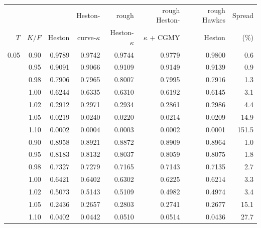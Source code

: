 \begin{tabular}{rrrrrrrr}
\toprule
 &  &  & Heston- & rough & rough Heston- & rough Hawkes & Spread\\
$T$ & $K/F$ & Heston & curve-$\kappa$ & Heston-$\kappa$ & $\kappa$ + CGMY & Heston & (\%)\\
\midrule
0.05 & 0.90 & 0.9789 & 0.9742 & 0.9744 & 0.9779 & 0.9800 & 0.6\\
 & 0.95 & 0.9091 & 0.9066 & 0.9109 & 0.9149 & 0.9139 & 0.9\\
 & 0.98 & 0.7906 & 0.7965 & 0.8007 & 0.7995 & 0.7916 & 1.3\\
 & 1.00 & 0.6244 & 0.6335 & 0.6310 & 0.6192 & 0.6145 & 3.1\\
 & 1.02 & 0.2912 & 0.2971 & 0.2934 & 0.2861 & 0.2986 & 4.4\\
 & 1.05 & 0.0219 & 0.0240 & 0.0220 & 0.0214 & 0.0209 & 14.9\\
 & 1.10 & 0.0002 & 0.0004 & 0.0003 & 0.0002 & 0.0001 & 151.5\\
\addlinespace
0.25 & 0.90 & 0.8958 & 0.8921 & 0.8872 & 0.8909 & 0.8964 & 1.0\\
 & 0.95 & 0.8183 & 0.8132 & 0.8037 & 0.8059 & 0.8075 & 1.8\\
 & 0.98 & 0.7327 & 0.7279 & 0.7165 & 0.7143 & 0.7135 & 2.7\\
 & 1.00 & 0.6421 & 0.6402 & 0.6302 & 0.6225 & 0.6214 & 3.3\\
 & 1.02 & 0.5073 & 0.5143 & 0.5109 & 0.4982 & 0.4974 & 3.4\\
 & 1.05 & 0.2436 & 0.2657 & 0.2803 & 0.2741 & 0.2677 & 15.1\\
 & 1.10 & 0.0402 & 0.0442 & 0.0510 & 0.0514 & 0.0436 & 27.7\\
\bottomrule
\end{tabular}

